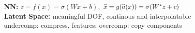 \textbf{NN:} $z = f(x) = \sigma(Wx + b)$, $\widehat{x} = g(\widehat{a} (x)) = \sigma(W^*z + c)$\\

\textbf{Latent Space:} meaningful DOF, continous and interpolatable\\
undercomp: compress, features; overcomp: copy components\\

